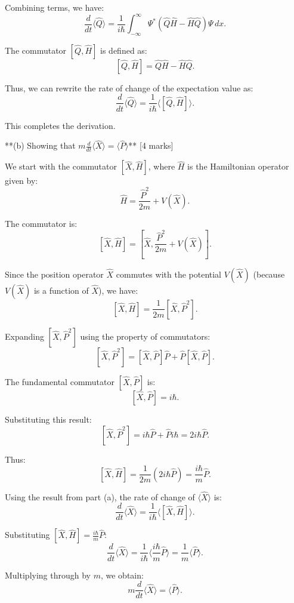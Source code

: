 Combining terms, we have:
\[
\frac{d}{dt} \langle \hat{Q} \rangle = \frac{1}{i\hbar} \int_{-\infty}^\infty \Psi^* \left(\hat{Q} \hat{H} - \hat{H} \hat{Q} \right) \Psi \, dx.
\]  

The commutator $[\hat{Q}, \hat{H}]$ is defined as:
\[
[\hat{Q}, \hat{H}] = \hat{Q} \hat{H} - \hat{H} \hat{Q}.
\]

Thus, we can rewrite the rate of change of the expectation value as:
\[
\frac{d}{dt} \langle \hat{Q} \rangle = \frac{1}{i\hbar} \langle [\hat{Q}, \hat{H}] \rangle.
\]  

This completes the derivation.  

**(b) Showing that $m \frac{d}{dt} \langle \hat{X} \rangle = \langle \hat{P} \rangle$** [4 marks]  

We start with the commutator $[\hat{X}, \hat{H}]$, where $\hat{H}$ is the Hamiltonian operator given by:
\[
\hat{H} = \frac{\hat{P}^2}{2m} + V(\hat{X}).
\]

The commutator is:
\[
[\hat{X}, \hat{H}] = \left[\hat{X}, \frac{\hat{P}^2}{2m} + V(\hat{X})\right].
\]

Since the position operator $\hat{X}$ commutes with the potential $V(\hat{X})$ (because $V(\hat{X})$ is a function of $\hat{X}$), we have:
\[
[\hat{X}, \hat{H}] = \frac{1}{2m} [\hat{X}, \hat{P}^2].
\]

Expanding $[\hat{X}, \hat{P}^2]$ using the property of commutators:
\[
[\hat{X}, \hat{P}^2] = [\hat{X}, \hat{P}] \hat{P} + \hat{P} [\hat{X}, \hat{P}].
\]

The fundamental commutator $[\hat{X}, \hat{P}]$ is:
\[
[\hat{X}, \hat{P}] = i\hbar.
\]

Substituting this result:
\[
[\hat{X}, \hat{P}^2] = i\hbar \hat{P} + \hat{P} i\hbar = 2i\hbar \hat{P}.
\]

Thus:
\[
[\hat{X}, \hat{H}] = \frac{1}{2m} (2i\hbar \hat{P}) = \frac{i\hbar}{m} \hat{P}.
\]

Using the result from part (a), the rate of change of $\langle \hat{X} \rangle$ is:
\[
\frac{d}{dt} \langle \hat{X} \rangle = \frac{1}{i\hbar} \langle [\hat{X}, \hat{H}] \rangle.
\]

Substituting $[\hat{X}, \hat{H}] = \frac{i\hbar}{m} \hat{P}$:
\[
\frac{d}{dt} \langle \hat{X} \rangle = \frac{1}{i\hbar} \langle \frac{i\hbar}{m} \hat{P} \rangle = \frac{1}{m} \langle \hat{P} \rangle.
\]

Multiplying through by $m$, we obtain:
\[
m \frac{d}{dt} \langle \hat{X} \rangle = \langle \hat{P} \rangle.
\]

